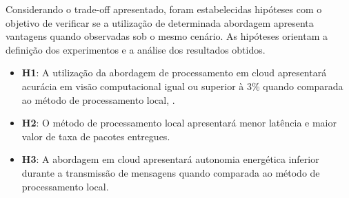 Considerando o trade-off apresentado, foram estabelecidas hipóteses com o objetivo de verificar se a utilização de determinada abordagem apresenta vantagens quando observadas sob o mesmo cenário.
As hipóteses orientam a definição dos experimentos e a análise dos resultados obtidos.

\begin{itemize}
	\item \textbf{H1}: A utilização da abordagem de processamento em cloud apresentará acurácia em visão computacional igual ou superior à 3\% quando comparada ao método de processamento local, \cite{lederhans2022tratamento}.
    \item \textbf{H2}: O método de processamento local apresentará menor latência e maior valor de taxa de pacotes entregues.
    \item \textbf{H3}: A abordagem em cloud apresentará autonomia energética inferior durante a transmissão de mensagens quando comparada ao método de processamento local.
\end{itemize} 






